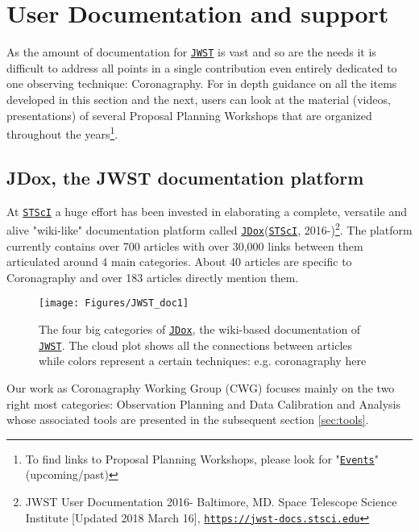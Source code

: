 \documentclass[]{spie}  %
\newcommand{\stsci}{{\tt \href{https://www.stsci.edu}{STScI}}\xspace}
\newcommand{\jwst}{{\tt \href{https://jwst.stsci.edu}{JWST}}\xspace}
\newcommand{\jdox}{{\tt \href{https://jwst-docs.stsci.edu/}{JDox}}\xspace}
\begin{document}
\section{User Documentation and support}
\label{sec:user}

As the amount of documentation for \jwst is vast and so are the needs it is difficult to address all points in a single contribution even entirely dedicated to one observing technique: Coronagraphy. For in depth guidance on all the items developed in this section and the next, users can look at the material (videos, presentations) of several Proposal Planning Workshops that are organized throughout the years\footnote{To find links to Proposal Planning Workshops, please look for "{\small \tt \href{https://jwst.stsci.edu/events}{Events}}" (upcoming/past)}.

\subsection{JDox, the JWST documentation platform}
\label{sec:doc}

At \stsci a huge effort has been invested in elaborating a complete, versatile and alive "wiki-like" documentation platform\cite{jdox_general} called {\small \tt \href{https://jwst-docs.stsci.edu}{\jdox}}(\stsci, 2016-)\footnote{JWST User Documentation 2016- Baltimore, MD. Space Telescope Science Institute [Updated 2018 March 16],  {\small \tt \href{https://jwst-docs.stsci.edu}{https://jwst-docs.stsci.edu}}}. The platform currently contains over 700 articles with over 30,000 links between them articulated around 4 main categories. About 40 articles are specific to Coronagraphy and over 183 articles directly mention them. 

\begin{figure}[h!]
\begin{center}
\texttt{[image: Figures/JWST\_doc1]}
\caption{The four big categories of {\small \tt \href{https://jwst-docs.stsci.edu/}{JDox}}, the wiki-based documentation of \jwst. The cloud plot shows all the connections between articles while colors represent a certain techniques: e.g. coronagraphy here}
\label{fig:jwst-doc}
\end{center}
\end{figure}

Our work as Coronagraphy Working Group (CWG) focuses mainly on the two right most categories: Observation Planning and Data Calibration and Analysis whose associated tools are presented in the subsequent section \ref{sec:tools}.
\end{document}
